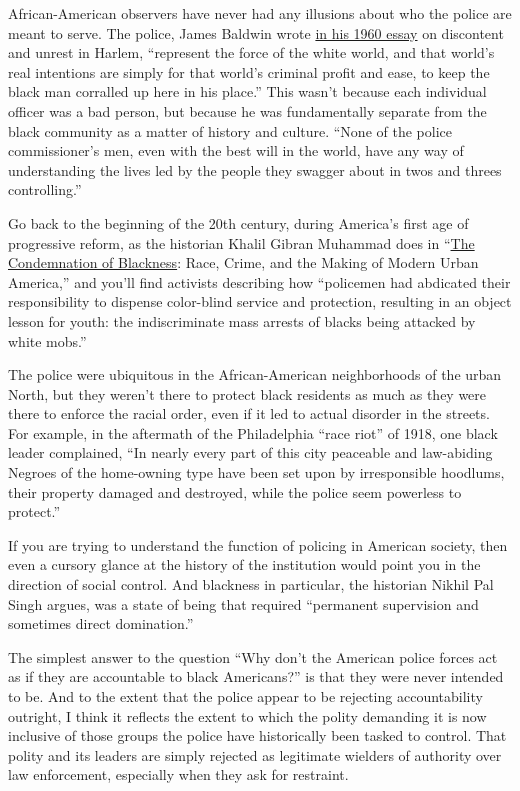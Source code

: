 African-American observers have never had any illusions about who the
police are meant to serve. The police, James Baldwin wrote
\href{https://www.esquire.com/news-politics/a3638/fifth-avenue-uptown/}{in
his 1960 essay} on discontent and unrest in Harlem, ``represent the
force of the white world, and that world's real intentions are simply
for that world's criminal profit and ease, to keep the black man
corralled up here in his place.'' This wasn't because each individual
officer was a bad person, but because he was fundamentally separate from
the black community as a matter of history and culture. ``None of the
police commissioner's men, even with the best will in the world, have
any way of understanding the lives led by the people they swagger about
in twos and threes controlling.''

Go back to the beginning of the 20th century, during America's first age
of progressive reform, as the historian Khalil Gibran Muhammad does in
``\href{https://www.hup.harvard.edu/catalog.php?isbn=9780674238145}{The
Condemnation of Blackness}: Race, Crime, and the Making of Modern Urban
America,'' and you'll find activists describing how ``policemen had
abdicated their responsibility to dispense color-blind service and
protection, resulting in an object lesson for youth: the indiscriminate
mass arrests of blacks being attacked by white mobs.''

The police were ubiquitous in the African-American neighborhoods of the
urban North, but they weren't there to protect black residents as much
as they were there to enforce the racial order, even if it led to actual
disorder in the streets. For example, in the aftermath of the
Philadelphia ``race riot'' of 1918, one black leader complained, ``﻿In
nearly every part of this city peaceable and law-abiding Negroes of the
home-owning type have been set upon by irresponsible hoodlums, their
property damaged and destroyed, while the police seem powerless to
protect.''

If you are trying to understand the function of policing in American
society, then even a cursory glance at the history of the institution
would point you in the direction of social control. And blackness in
particular, the historian Nikhil Pal Singh argues, was a state of being
that required ``permanent supervision and sometimes direct domination.''

The simplest answer to the question ``Why don't the American police
forces act as if they are accountable to black Americans?'' is that they
were never intended to be. And to the extent that the police appear to
be rejecting accountability outright, I think it reflects the extent to
which the polity demanding it is now inclusive of those groups the
police have historically been tasked to control. That polity and its
leaders are simply rejected as legitimate wielders of authority over law
enforcement, especially when they ask for restraint.


